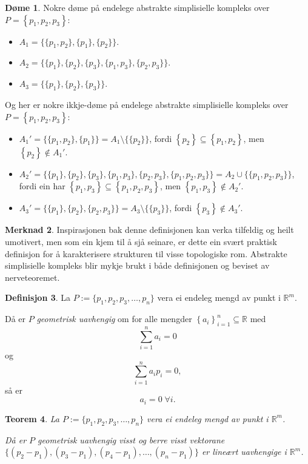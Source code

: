 \documentclass[a4paper, 12pt, norsk]{article}
\theoremstyle{plain}
\newtheorem{theorem}{Teorem}[section]
\theoremstyle{definition}
\newtheorem{definition}[theorem]{Definisjon}
\newtheorem{example}[theorem]{Døme}
\newtheorem{remark}[theorem]{Merknad}
\newcommand{\Rb}{\mathbb{R}}
\newcommand{\union}{ \mathop{\cup}\limits }
\newcommand{\set}[1]{ \left\{ #1 \right\} } %
\begin{document}
\begin{example}
	Nokre døme på endelege abstrakte simplisielle kompleks over \( P=\set{p_1, p_2, p_3} \):

	\begin{itemize}
		\item{$A_1=\{\{p_1, p_2\}, \{p_1\}, \{p_2\}\}$.}
		\item{$A_2=\{\{p_1\}, \{p_2\}, \{p_3\}, \{p_1, p_3\}, \{p_2, p_3\}\}$.}
		\item{$A_3=\{\{p_1\}, \{p_2\}, \{p_3\}\}$.}
	\end{itemize}

	Og her er nokre ikkje-døme på endelege abstrakte simplisielle kompleks over \( P=\set{p_1, p_2, p_3} \):

	\begin{itemize}
		\item{$A_1'=\{\{p_1, p_2\}, \{p_1\}\}=A_1 \setminus \{\{p_2\}\}$, fordi \( \set{p_2} \subseteq \set{p_1, p_2} \), men \( \set{p_2} \not\in A_1' \).}
		\item{$A_2'=\{\{p_1\}, \{p_2\}, \{p_3\}, \{p_1, p_3\}, \{p_2, p_3\}, \{p_1, p_2, p_3\}\}=A_2 \union \{\{p_1, p_2, p_3\}\}$, fordi ein har \( \set{p_1, p_3} \subseteq \set{p_1, p_2, p_3} \), men \( \set{p_1, p_3} \not\in A_2' \).}
		\item{$A_3'=\{\{p_1\}, \{p_2\}, \{p_2, p_3\}\}=A_3 \setminus \{\{p_3\}\}$, fordi \( \set{p_3} \not\in A_3' \).}
	\end{itemize}
\end{example}

\begin{remark}
	Inspirasjonen bak denne definisjonen kan verka tilfeldig og heilt umotivert, men som ein kjem til å sjå seinare, er dette ein svært praktisk definisjon for å karakterisere strukturen til visse topologiske rom. Abstrakte simplisielle kompleks blir mykje brukt i både definisjonen og beviset av nerveteoremet.
\end{remark}

\begin{definition}
	La $ P := \{p_1, p_2, p_3, \dots, p_n\}$ vera ei endeleg mengd av punkt i $\Rb^m$.

	Då er \( P \) \emph{geometrisk uavhengig} om for alle mengder \( \set{a_i}_{i=1}^n\subseteq\Rb \) med
	\[
		\sum_{i=1}^n a_i=0  
	\]
	og
	\[
		\sum_{i=1}^n a_ip_i=0,
	\]
	så er
	\[
		a_i=0 \; \forall i.
	\]
\end{definition}

\begin{theorem}\label{thm:geometrisklineærtuavhengig}
	La $ P := \{p_1, p_2, p_3, \dots, p_n \}$ vera ei endeleg mengd av punkt i \( \Rb^m \).

	Då er \( P \) geometrisk uavhengig visst og berre visst vektorane $\{(p_2-p_1), (p_3-p_1), (p_4-p_1),\dots,(p_n-p_1)\}$ er lineært uavhengige i \( \Rb^m \).
\end{theorem}
\end{document}

